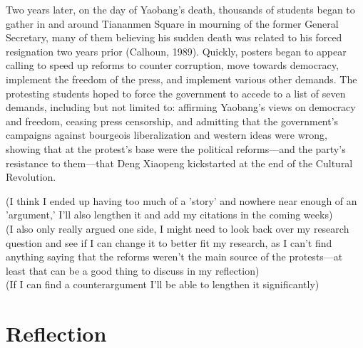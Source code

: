 \documentclass{paper}
\begin{document}
\begin{doublespace}
Two years later, on the day of Yaobang's death, thousands of students began to gather in and around Tiananmen Square in mourning of the former General Secretary, many of them believing his sudden death was related to his forced resignation two years prior (Calhoun, 1989). Quickly, posters began to appear calling to speed up reforms to counter corruption, move towards democracy, implement the freedom of the press, and implement various other demands. The protesting students hoped to force the government to accede to a list of seven demands, including but not limited to: affirming Yaobang's views on democracy and freedom, ceasing press censorship, and admitting that the government's campaigns against bourgeois liberalization and western ideas were wrong, showing that at the protest's base were the political reforms---and the party's resistance to them---that Deng Xiaopeng kickstarted at the end of the Cultural Revolution.
\end{doublespace}

(I think I ended up having too much of a 'story' and nowhere near enough of an 'argument,' I'll also lengthen it and add my citations in the coming weeks)\\
(I also only really argued one side, I might need to look back over my research question and see if I can change it to better fit my research, as I can't find anything saying that the reforms weren't the main source of the protests---at least that can be a good thing to discuss in my reflection)\\
(If I can find a counterargument I'll be able to lengthen it significantly)\\
\newpage

\section{Reflection}
\begin{doublespace}
\end{doublespace}
\end{document}
